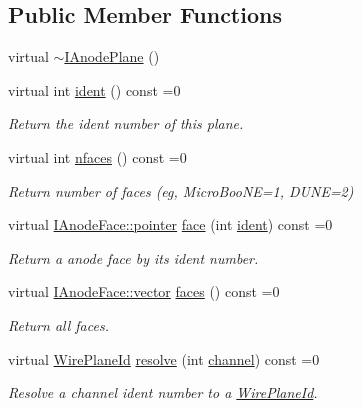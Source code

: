 \subsection*{Public Member Functions}
\begin{DoxyCompactItemize}
\item 
virtual \hyperlink{class_wire_cell_1_1_i_anode_plane_a480bd95f6ccae8e93edc4476fe34f90b}{$\sim$\+I\+Anode\+Plane} ()
\item 
virtual int \hyperlink{class_wire_cell_1_1_i_anode_plane_a18dfeccffc41a8fca3631a4e98967c57}{ident} () const =0
\begin{DoxyCompactList}\small\item\em Return the ident number of this plane. \end{DoxyCompactList}\item 
virtual int \hyperlink{class_wire_cell_1_1_i_anode_plane_ace24697d669e5b25613db8ad110611f0}{nfaces} () const =0
\begin{DoxyCompactList}\small\item\em Return number of faces (eg, Micro\+Boo\+NE=1, D\+U\+NE=2) \end{DoxyCompactList}\item 
virtual \hyperlink{class_wire_cell_1_1_interface_a09c548fb8266cfa39afb2e74a4615c37}{I\+Anode\+Face\+::pointer} \hyperlink{class_wire_cell_1_1_i_anode_plane_ad420395805cd4a1c07253b535768fd5a}{face} (int \hyperlink{class_wire_cell_1_1_i_anode_plane_a18dfeccffc41a8fca3631a4e98967c57}{ident}) const =0
\begin{DoxyCompactList}\small\item\em Return a anode face by its ident number. \end{DoxyCompactList}\item 
virtual \hyperlink{class_wire_cell_1_1_i_component_a18978d88ce697af5941655a89660fd4e}{I\+Anode\+Face\+::vector} \hyperlink{class_wire_cell_1_1_i_anode_plane_a22ebdffd5613bf8007e0ae314984c36a}{faces} () const =0
\begin{DoxyCompactList}\small\item\em Return all faces. \end{DoxyCompactList}\item 
virtual \hyperlink{class_wire_cell_1_1_wire_plane_id}{Wire\+Plane\+Id} \hyperlink{class_wire_cell_1_1_i_anode_plane_a566ba20aec7e85b99a9f4304f073afa0}{resolve} (int \hyperlink{class_wire_cell_1_1_i_anode_plane_ab9cab29e958c7cc4aa7dd9cb600c33cd}{channel}) const =0
\begin{DoxyCompactList}\small\item\em Resolve a channel ident number to a \hyperlink{class_wire_cell_1_1_wire_plane_id}{Wire\+Plane\+Id}. \end{DoxyCompactList}\item 

\end{DoxyCompactItemize}
